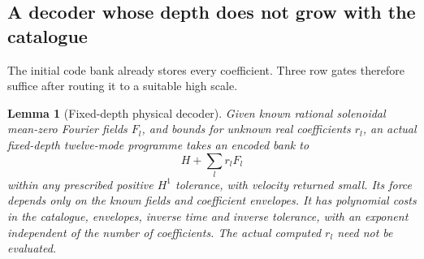 \documentclass[11pt,a4paper]{amsart}
\newtheorem{lemma}[theorem]{Lemma}
\theoremstyle{definition}
\theoremstyle{remark}
\numberwithin{equation}{section}
\begin{document}
\subsection{A decoder whose depth does not grow with the catalogue}
The initial code bank already stores every coefficient.  Three row gates
therefore suffice after routing it to a suitable high scale.

\begin{lemma}[Fixed-depth physical decoder]\label{lem:decoder}
Given known rational solenoidal mean-zero Fourier fields $F_l$, and bounds
for unknown real coefficients $r_l$, an actual fixed-depth twelve-mode
programme takes an encoded bank to
\begin{equation}\label{eq:decoder-target}
 H+\sum_l r_lF_l
\end{equation}
within any prescribed positive $H^1$ tolerance, with velocity returned
small.  Its force depends only on the known fields and coefficient
envelopes.  It has polynomial costs in the catalogue, envelopes, inverse
time and inverse tolerance, with an exponent independent of the number
of coefficients.  The actual computed $r_l$ need not be evaluated.
\end{lemma}
\end{document}
